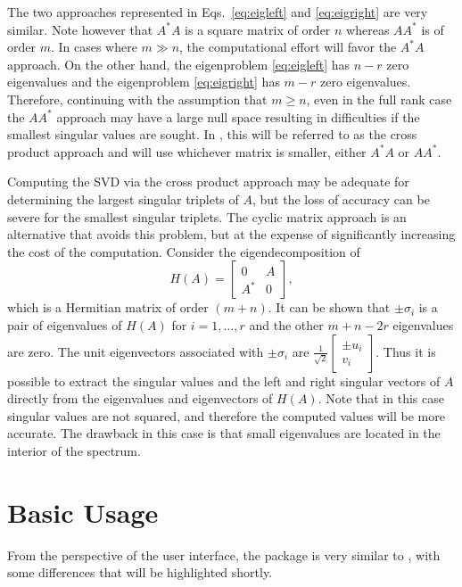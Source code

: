 The two approaches represented in Eqs.\ \ref{eq:eigleft} and \ref{eq:eigright} are very similar. Note however that $A^*A$ is a square matrix of order $n$ whereas $AA^*$ is of order $m$. In cases where $m\gg n$, the computational effort will favor the $A^*A$ approach. On the other hand, the eigenproblem \ref{eq:eigleft} has $n-r$ zero eigenvalues and the eigenproblem \ref{eq:eigright} has $m-r$ zero eigenvalues. Therefore, continuing with the assumption that $m\geq n$, even in the full rank case the $AA^*$ approach may have a large null space resulting in difficulties if the smallest singular values are sought. In \slepc, this will be referred to as the cross product approach and will use whichever matrix is smaller, either $A^*A$ or $AA^*$.

Computing the SVD via the cross product approach may be adequate for determining the largest singular triplets of $A$, but the loss of accuracy can be severe for the smallest singular triplets. The cyclic matrix approach is an alternative that avoids this problem, but at the expense of significantly increasing the cost of the computation. Consider the eigendecomposition of
\begin{equation}
\label{eq:cyclic}
H(A)=\left[\begin{matrix}0&A\\A^*&0\end{matrix}\right],
\end{equation}
which is a Hermitian matrix of order $(m+n)$. It can be shown that $\pm\sigma_i$ is a pair of eigenvalues of $H(A)$ for $i=1,\ldots,r$ and the other $m+n-2r$ eigenvalues are zero. The unit eigenvectors associated with $\pm\sigma_i$ are $\frac{1}{\sqrt{2}}\left[\begin{smallmatrix}\pm u_i\\v_i\end{smallmatrix}\right]$. Thus it is possible to extract the singular values and the left and right singular vectors of $A$ directly from the eigenvalues and eigenvectors of $H(A)$. Note that in this case singular values are not squared, and therefore the computed values will be more accurate. The drawback in this case is that small eigenvalues are located in the interior of the spectrum.

\section{Basic Usage}

From the perspective of the user interface, the  package is very similar to , with some differences that will be highlighted shortly.

